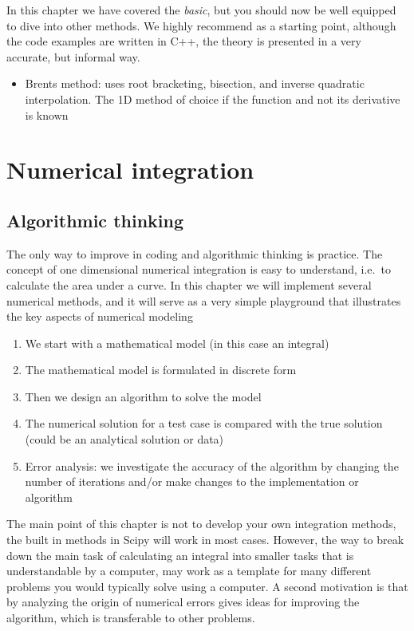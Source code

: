 \documentclass[graybox,sectrefs,envcountresetchap,open=right,final]{svmonodo}
\begin{document}
In this chapter we have covered the \emph{basic}, but you should now be well equipped to dive into other methods. We highly recommend \cite{press2001} as a starting point, although the code examples are written in C++, the theory is presented in a very accurate, but informal way.
\begin{itemize}
\item Brents method:  uses root bracketing, bisection, and inverse quadratic interpolation. The 1D method of choice if the function and not its derivative is known
\end{itemize}

\noindent

\chapter{Numerical integration}
\label{ch:numint}

\section{Algorithmic thinking}

The only way to improve in coding and algorithmic thinking is practice. The concept of one dimensional numerical integration is easy to understand, i.e.~to calculate the area under a curve. In this chapter we will implement several numerical methods, and it will serve as a very simple playground that illustrates the key aspects of numerical modeling

\begin{enumerate}
\item We start with a mathematical model (in this case an integral)

\item The mathematical model is formulated in discrete form 

\item Then we design an algorithm to solve the model 

\item The numerical solution for a test case is compared with the true solution (could be an analytical solution or data)

\item Error analysis: we investigate the accuracy of the algorithm by changing the number of iterations and/or make changes to the implementation or algorithm
\end{enumerate}

\noindent
The main point of this chapter is not to develop your own integration methods, the built in methods in Scipy will work in most cases. However, the way to break down the main task of calculating an integral into smaller tasks that is understandable by a computer, may work as a template for many different problems you would typically solve using a computer. A second motivation is that by analyzing the origin of numerical errors gives ideas for improving the algorithm, which is transferable to other problems.      
\end{document}
